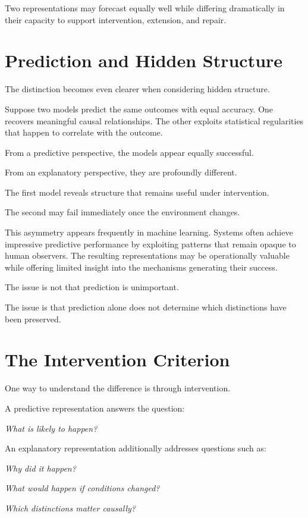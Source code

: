 \documentclass[11pt,oneside,openany]{book}
\begin{document}
Two representations may forecast equally well while differing dramatically in their capacity to support intervention, extension, and repair.

\section{Prediction and Hidden Structure}

The distinction becomes even clearer when considering hidden structure.

Suppose two models predict the same outcomes with equal accuracy. One recovers meaningful causal relationships. The other exploits statistical regularities that happen to correlate with the outcome.

From a predictive perspective, the models appear equally successful.

From an explanatory perspective, they are profoundly different.

The first model reveals structure that remains useful under intervention.

The second may fail immediately once the environment changes.

This asymmetry appears frequently in machine learning. Systems often achieve impressive predictive performance by exploiting patterns that remain opaque to human observers. The resulting representations may be operationally valuable while offering limited insight into the mechanisms generating their success.

The issue is not that prediction is unimportant.

The issue is that prediction alone does not determine which distinctions have been preserved.

\section{The Intervention Criterion}

One way to understand the difference is through intervention.

A predictive representation answers the question:

\emph{What is likely to happen?}

An explanatory representation additionally addresses questions such as:

\emph{Why did it happen?}

\emph{What would happen if conditions changed?}

\emph{Which distinctions matter causally?}
\end{document}
